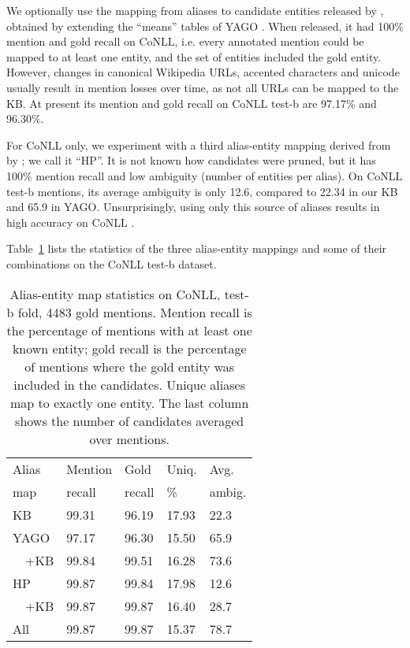 We optionally use the mapping from aliases to candidate entities released
by , obtained by extending the
``means'' tables of YAGO \cite{hoffart2013yago2}.  When released,
it had 100\% mention and gold recall on CoNLL, i.e. every annotated mention
could be mapped to at least one entity, and the set of entities included the gold entity. 
However, changes in canonical Wikipedia URLs, accented characters and
unicode usually result in mention losses over time, as not all URLs can be mapped to the KB.
At present its mention and gold recall on CoNLL test-b are 97.17\% and 96.30\%.

For CoNLL only, we experiment with a third alias-entity mapping derived 
from  by ; we call it ``HP''.  
It is not known how candidates were pruned, but it has 100\% mention recall
and low ambiguity (number of entities per alias).
On CoNLL test-b mentions, its average ambiguity is only 12.6, compared to 22.34 in our KB
and 65.9 in YAGO.  Unsurprisingly, using only this source of aliases results in
high accuracy on CoNLL \cite{Pershina2015,YamadaS0T16}.

Table~\ref{tab:AliasTable} lists the statistics of the three alias-entity mappings
and some of their combinations on the CoNLL test-b dataset.


\begin{table}
  \centering
  \begin{tabular}{l|l|l|l|l}
    Alias  & Mention &   Gold  & Uniq.  & Avg.  \\
    map    & recall  & recall  & \%     & ambig. \\
    \hline
    KB & 99.31 & 96.19 & 17.93 & 22.3 \\
    \hline
    YAGO   & 97.17 & 96.30 & 15.50 & 65.9 \\
    ~~+KB  & 99.84 & 99.51 & 16.28 & 73.6 \\
    \hline
    HP     & 99.87 & 99.84 & 17.98 & 12.6 \\
    ~~+KB  & 99.87 & 99.87 & 16.40 & 28.7 \\
    \hline
    All    & 99.87 & 99.87 & 15.37 & 78.7
  \end{tabular}
  \caption{Alias-entity map statistics on CoNLL, test-b
    fold, 4483 gold mentions.  Mention recall is the percentage of
    mentions with at least one known entity; gold recall is the percentage
    of mentions where the gold entity was included in the candidates.
    Unique aliases map to exactly one entity.  The last column
    shows the number of candidates averaged over mentions.}
  \label{tab:AliasTable}
\end{table}


